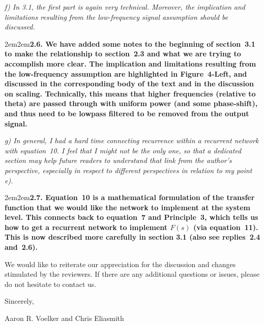 \documentclass[a4paper]{article}
\newcommand{\newl}{\par\null\par}
\newcommand{\REVIEW}[1]{{\it #1}}
\newcommand{\REPLY}[1]{\newl\begin{adjustwidth}{2em}{2em}{\bf #1}\end{adjustwidth}\newl}
\begin{document}
\REVIEW{f)      In 3.1, the first part is again very technical. Moreover, the implication and limitations resulting from the low-frequency signal assumption should be discussed.}

\REPLY{2.6. We have added some notes to the beginning of section~3.1 to make the relationship to section~2.3 and what we are trying to accomplish more clear.
The implication and limitations resulting from the low-frequency assumption are highlighted in Figure~4-Left, and discussed in the corresponding body of the text and in the discussion on scaling.
Technically, this means that higher frequencies (relative to theta) are passed through with uniform power (and some phase-shift), and thus need to be lowpass filtered to be removed from the output signal.}

\REVIEW{g)      In general, I had a hard time connecting recurrence within a recurrent network with equation~10. I feel that I might not be the only one, so that a dedicated section may help future readers to understand that link from the author's perspective, especially in respect to different perspectives in relation to my point e).}

\REPLY{2.7. Equation~10 is a mathematical formulation of the transfer function that we would like the network to implement at the system level. 
This connects back to equation~7 and Principle~3, which tells us how to get a recurrent network to implement $F(s)$ (via equation~11).
This is now described more carefully in section 3.1 (also see replies~2.4 and~2.6).}

We would like to reiterate our appreciation for the discussion and changes stimulated by the reviewers.
If there are any additional questions or issues, please do not hesitate to contact us.
\newl
Sincerely,

Aaron R. Voelker and Chris Eliasmith
\end{document}
